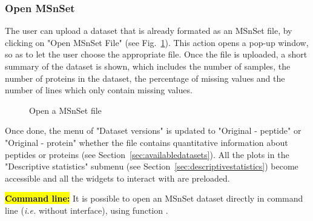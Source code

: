 \documentclass[12pt]{article}
\begin{document}
\subsubsection{Open MSnSet} \label{sec:load}
The user can upload a dataset that is already formated as an MSnSet file, by 
clicking on "Open MSnSet File" (see Fig.~\ref{fig:open}). This action opens a 
pop-up window, so as to let the user choose the appropriate file. Once the 
file is uploaded, a short summary of the dataset is shown, which includes the 
number of samples, the number of proteins in the dataset, the percentage of 
missing values and the number of lines which only contain missing 
values.\newline
\begin {figure}
\centering
{}
\caption{Open a MSnSet file}\label{fig:open}
\end {figure}
{Once done, the menu of "Dataset versions" is updated to "Original - peptide" 
or "Original - protein" whether the file contains quantitative information 
about peptides or proteins (see Section~\ref{sec:availabledatasets}).} All 
the plots in the "Descriptive statistics" submenu (see 
Section~\ref{sec:descriptivestatistics}) become accessible and all the 
widgets to interact with  are preloaded.

\hl{\bf Command line:} It is possible to open an MSnSet dataset directly in 
command line (\emph{i.e.} without  interface), using 
function .
\end{document}
